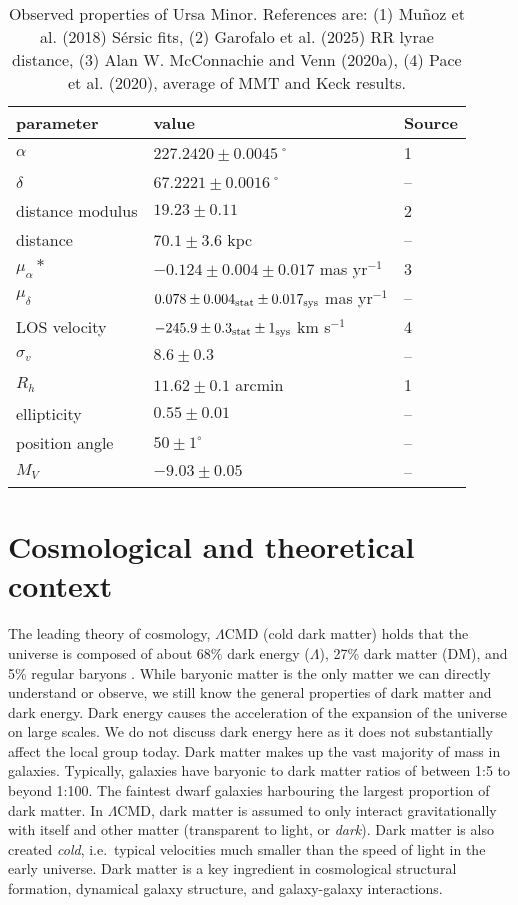 \begin{table*}[t]
\centering
\caption[Observed Properties of Ursa Minor]{Observed properties of Ursa Minor. References are: (1) Muñoz et al. (2018) Sérsic fits, (2) Garofalo et al. (2025) RR lyrae distance, (3) Alan W. McConnachie and Venn (2020a), (4) Pace et al. (2020), average of MMT and Keck results. }
\label{tbl:umi_obs_props}
\begin{tabular}{lll}
\toprule
parameter & value & Source\\
\midrule
$\alpha$ & $ 227.2420 \pm 0.0045$˚ & 1\\
$\delta$ & $67.2221 \pm 0.0016$˚ & –\\
distance modulus & $19.23 \pm 0.11$ & 2\\
distance & $70.1 \pm 3.6$ kpc & –\\
$\mu_\alpha*$ & $-0.124 \pm 0.004 \pm 0.017$ mas yr$^{-1}$ & 3\\
$\mu_\delta$ & $0.078 \pm 0.004_{\rm stat} \pm 0.017_{\rm sys}$ mas yr$^{-1}$ & –\\
LOS velocity & $-245.9 \pm 0.3_{\rm stat} \pm 1_{\rm sys}$ km s$^{-1}$ & 4\\
$\sigma_v$ & $8.6 \pm 0.3$ & –\\
$R_h$ & $11.62 \pm 0.1$ arcmin & 1\\
ellipticity & $0.55 \pm 0.01$ & –\\
position angle & $50 \pm 1^\circ$ & –\\
$M_V$ & $-9.03 \pm 0.05$ & –\\
\bottomrule
\end{tabular}
\end{table*}

\section{Cosmological and theoretical
context}\label{cosmological-and-theoretical-context}

The leading theory of cosmology, \(\Lambda\)CMD (cold dark matter) holds
that the universe is composed of about 68\% dark energy (\(\Lambda\)),
27\% dark matter (DM), and 5\% regular baryons
\citep{planckcollaboration+2020}. While baryonic matter is the only
matter we can directly understand or observe, we still know the general
properties of dark matter and dark energy. Dark energy causes the
acceleration of the expansion of the universe on large scales. We do not
discuss dark energy here as it does not substantially affect the local
group today. Dark matter makes up the vast majority of mass in galaxies.
Typically, galaxies have baryonic to dark matter ratios of between 1:5
to beyond 1:100. The faintest dwarf galaxies harbouring the largest
proportion of dark matter. In \(\Lambda\)CMD, dark matter is assumed to
only interact gravitationally with itself and other matter (transparent
to light, or \emph{dark}). Dark matter is also created \emph{cold},
i.e.~typical velocities much smaller than the speed of light in the
early universe. Dark matter is a key ingredient in cosmological
structural formation, dynamical galaxy structure, and galaxy-galaxy
interactions.

